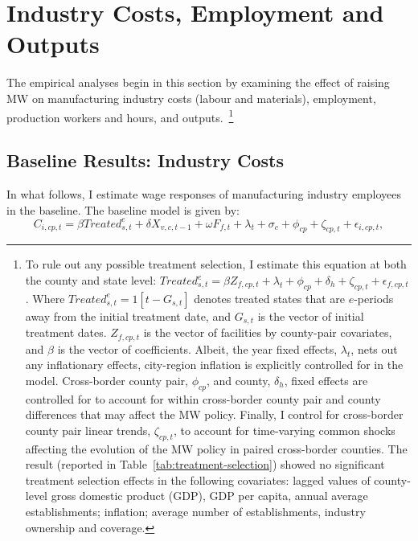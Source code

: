 \documentclass{C:/Users/david/OneDrive/Documents/ULMS/PhD/Thesis/chapter3/src/climate_change/latex/Economic_Journal/OUP-EJ}
\begin{document}
    \section{Industry Costs, Employment and Outputs}\label{sec:industry-costs-employment-and-outputs}
    The empirical analyses begin in this section by examining the effect of raising MW on manufacturing industry costs (labour and materials), employment, production workers and hours, and outputs.~\footnote{\tiny To rule out any possible treatment selection, I estimate this equation at both the county and state level: $Treated_{s,t}^e = \beta Z_{f,cp,t} + \lambda_{t} + \phi_{cp} + \delta_{h} + \zeta_{cp,t} + \epsilon_{f,cp,t}$. Where $Treated_{s,t}^e = 1[t - G_{s,t}]$ denotes treated states that are $e$-periods away from the initial treatment date, and $G_{s,t}$ is the vector of initial treatment dates. $Z_{f,cp,t}$ is the vector of facilities by county-pair covariates, and $\beta$ is the vector of coefficients. Albeit, the year fixed effects, $\lambda_{t}$, nets out any inflationary effects, city-region inflation is explicitly controlled for in the model. Cross-border county pair, $\phi_{cp}$, and county, $\delta_{h}$, fixed effects are controlled for to account for within cross-border county pair and county differences that may affect the MW policy. Finally, I control for cross-border county pair linear trends, $\zeta_{cp,t}$, to account for time-varying common shocks affecting the evolution of the MW policy in paired cross-border counties. The result (reported in Table~\ref{tab:treatment-selection}) showed no significant treatment selection effects in the following covariates: lagged values of county-level gross domestic product (GDP), GDP per capita, annual average establishments; inflation; average number of establishments, industry ownership and coverage.}

    \subsection{Baseline Results: Industry Costs}\label{subsec:baseline-results-industry-costs}
    In what follows, I estimate wage responses of manufacturing industry employees in the baseline. The baseline model is given by:
    \begin{equation}
        C_{i,cp,t} = \beta Treated_{s,t}^e + \delta X_{v,c,t-1} + \omega F_{f,t} + \lambda_{t} + \sigma_{c} + \phi_{cp} + \zeta_{cp,t} + \epsilon_{i,cp,t},\label{eq:baseline-wages}
    \end{equation}
\end{document}

